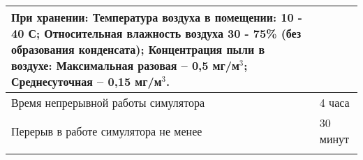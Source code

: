 {{\begin{flushleft}
\begin{spacing}{0.9}
\begin{longtable}{|p{4cm}|p{5.5cm}|}
            \newline
            {\bf При хранении:}\newline\newline
            Температура воздуха в помещении: 10 - 40 \textdegree{}С; \newline\newline
            Относительная влажность воздуха 30 - 75\% \newline(без образования конденсата);\newline\newline
            Концентрация пыли в воздухе: \newline
            Максимальная разовая – 0,5 мг/м$^3$;\newline
            Среднесуточная – 0,15 мг/м$^3$.\\\hline
            Время непрерывной работы симулятора & 4 часа\\\hline
            Перерыв в работе симулятора не менее & 30 минут\\\hline 
        \fi
    
    \end{longtable}
    \end{spacing}  
    \end{flushleft}
    }
    \pagebreak
}
\fi

